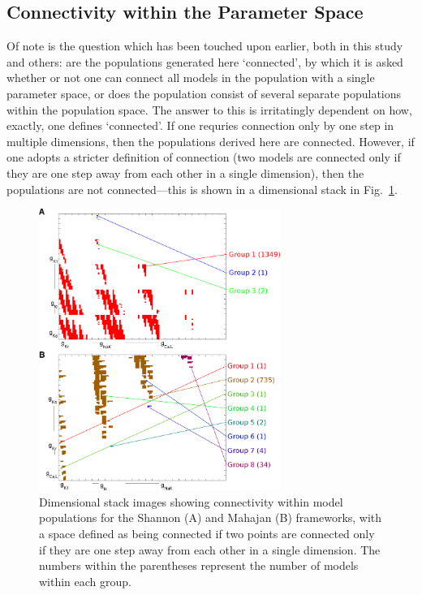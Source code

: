 \documentclass[../thesis-main.tex]{subfiles}
\begin{document}
\subsection{Connectivity within the Parameter Space}
\label{subsec:space-connectivity}
Of note is the question which has been touched upon earlier, both in this study and others: are the populations generated here `connected', by which it is asked whether or not one can connect all models in the population with a single parameter space, or does the population consist of several separate populations within the population space. The answer to this is irritatingly dependent on how, exactly, one defines `connected'. If one requries connection only by one step in multiple dimensions, then the populations derived here are connected. However, if one adopts a stricter definition of connection (two models are connected only if they are one step away from each other in a single dimension), then the populations are not connected---this is shown in a dimensional stack in Fig.~\ref{fig:space-connectivity}.
\begin{figure}
 \centering
 \includegraphics[width=0.7\textwidth]{space-connectivity}
 \caption[Connectivity within model populations.]{Dimensional stack images showing connectivity within model populations for the Shannon (A) and Mahajan (B) frameworks, with a space defined as being connected if two points are connected only if they are one step away from each other in a single dimension. The numbers within the parentheses represent the number of models within each group.}
 \label{fig:space-connectivity}
\end{figure}
\end{document}
